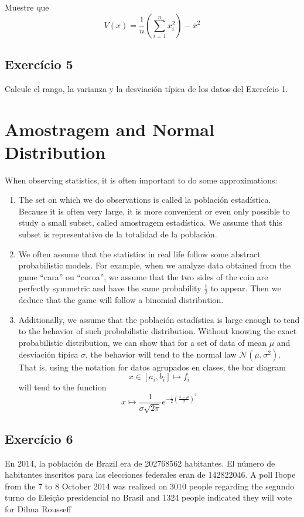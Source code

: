 Muestre que
$$
V(x) =
\frac{1}{n}
\left(\sum_{i=1}^n x_i^2\right) - \overline{x}^2
$$
\subsection*{Exercício 5}

Calcule el rango, la varianza y la desviación típica de los datos del
Exercício 1.

\section{Amostragem and Normal Distribution}

When observing statistics, it is often important to do some approximations:

\begin{enumerate}
\item The set on which we do observations is called la población estadística.
  Because it is often very large, it is more convenient or even only possible
  to study a small subset, called amostragem estadística.
  We assume that this subset is representativo de la totalidad de la población.
\item We often assume that the statistics in real life follow some abstract
  probabilistic models. For example, when we analyze data obtained from the
  game ``cara'' ou ``coroa'', we assume that the two sides of the coin are
  perfectly symmetric and have the same probability $\frac{1}{2}$ to appear.
  Then we deduce that the game will follow a binomial distribution.
\item Additionally, we assume that the población estadística is large enough to
  tend to the behavior of such probabilistic distribution. Without knowing the
  exact probabilistic distribution, we can show that for a set of data of mean
  $\mu$ and desviación típica $\sigma$, the behavior will tend to the normal
  law ${\mathscr N}(\mu, \sigma^2)$.
  That is, using the notation for datos agrupados en clases, the bar diagram
  $$x \in {[a_i, b_i]} \mapsto f_i$$
  will tend to the function
  $$x \mapsto
  \frac{1}{\sigma \sqrt{2\pi}} e^{-\frac{1}{2} \left(\frac{x-\mu}{\sigma}\right)^2}$$
\end{enumerate}

\subsection*{Exercício 6}

En 2014, la población de Brazil era de 202768562 habitantes.
El número de habitantes inscritos para las elecciones federales eran de
142822046.
A poll Ibope from the 7 to 8 October 2014 was realized on 3010 people
regarding the segundo turno do Eleição presidencial no Brasil and 1324 people
indicated they will vote for Dilma Rousseff

